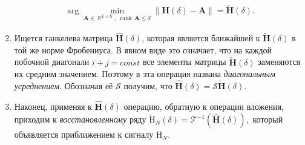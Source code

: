 \documentclass[specialist,
               substylefile = spbu_report.rtx,
               subf,href,colorlinks=true, 12pt]{disser}
\newcommand\norm[1]{\left\|#1\right\|}
\DeclareMathOperator\R{\mathbb{R}}
\DeclareMathOperator\rank{\textrm{rank}\,}
\begin{document}
\begin{enumerate}
\begin{gather*}
		\arg\min_{\mathbf{A}\in\R^{L\times K},\,\rank \mathbf{A} \leqslant d}\norm{\mathbf{H}(\delta) - \mathbf{A}}=\widetilde{ \mathbf{H}}(\delta).
	\end{gather*}
	\item
	Ищется ганкелева матрица  $\widehat{ \mathbf{H}}(\delta)$, которая является ближайшей к  $\widetilde{ \mathbf{H}}(\delta)$ в той же норме
	Фробениуса.
	В явном виде это означает, что на каждой побочной диагонали $i+j=const$ все элементы матрицы $\widetilde{ \mathbf{H}}(\delta)$ заменяются их
	средним значением. Поэтому
	в \cite{GNZh01} эта операция названа {\it диагональным усреднением}. Обозначая её $\mathcal{S}$ получим, что   $\widehat{\mathbf{H}}(\delta)=\mathcal{S} \widetilde{ \mathbf{H}}(\delta)$.
	\item
	Наконец, применяя к $\widehat{ \mathbf{H}}(\delta)$ операцию, обратную к операции вложения, приходим к {\it восстановленному} ряду $\widetilde{\mathrm{H}}_{N}(\delta)=\mathcal{T}^{-1}(\widehat{\mathbf{H}}(\delta)),$
	который объявляется приближением к сигналу $\mathrm{H}_N$.
\end{enumerate}
\end{document}

